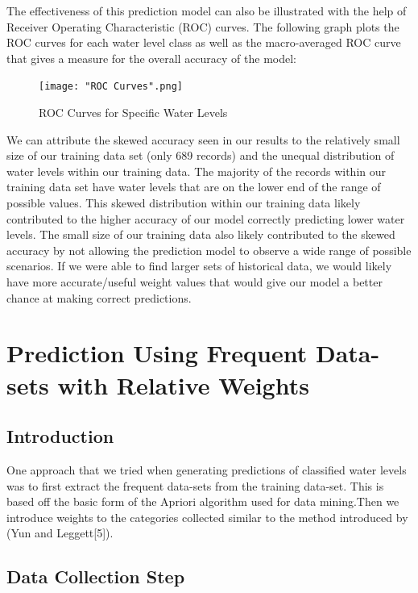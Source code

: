 \documentclass[10pt, conference, compsocconf]{IEEEtran}
\begin{document}
The effectiveness of this prediction model can also be illustrated with the help of Receiver Operating Characteristic (ROC) curves. The following graph plots the ROC curves for each water level class as well as the macro-averaged ROC curve that gives a measure for the overall accuracy of the model:

\begin{figure}[ht]
\texttt{[image: "ROC Curves".png]}
\centering
\caption{ROC Curves for Specific Water Levels}
\end{figure}

We can attribute the skewed accuracy seen in our results to the relatively small size of our training data set (only 689 records) and the unequal distribution of water levels within our training data. The majority of the records within our training data set have water levels that are on the lower end of the range of possible values. This skewed distribution within our training data likely contributed to the higher accuracy of our model correctly predicting lower water levels. The small size of our training data also likely contributed to the skewed accuracy by not allowing the prediction model to observe a wide range of possible scenarios. If we were able to find larger sets of historical data, we would likely have more accurate/useful weight values that would give our model a better chance at making correct predictions.

\section{Prediction Using Frequent Data-sets with Relative Weights}

\subsection{Introduction}

One approach that we tried when generating predictions of classified water levels was to first extract the frequent data-sets from the training data-set. This is based off the basic form of the Apriori algorithm used for data mining.Then we introduce weights to the categories collected similar to the method introduced by (Yun and Leggett[5]).

\subsection{Data Collection Step}
\end{document}
